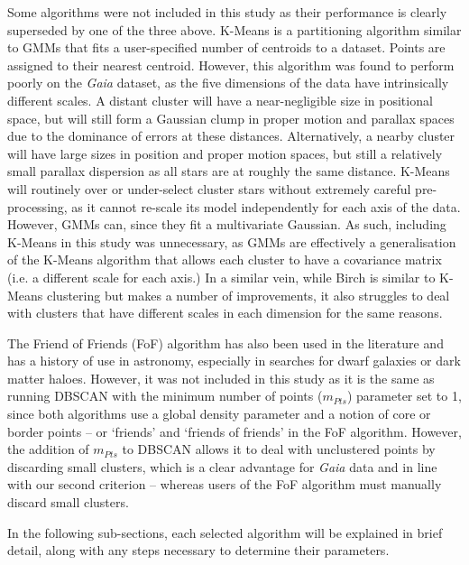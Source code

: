 Some algorithms were not included in this study as their performance is clearly superseded by one of the three above. K-Means \citep{macqueen_methods_1967} is a partitioning algorithm similar to GMMs that fits a user-specified number of centroids to a dataset. Points are assigned to their nearest centroid. However, this algorithm was found to perform poorly on the \emph{Gaia} dataset, as the five dimensions of the data have intrinsically different scales. A distant cluster will have a near-negligible size in positional space, but will still form a Gaussian clump in proper motion and parallax spaces due to the dominance of \emph{} errors at these distances. Alternatively, a nearby cluster will have large sizes in position and proper motion spaces, but still a relatively small parallax dispersion as all stars are at roughly the same distance. K-Means will routinely over or under-select cluster stars without extremely careful pre-processing, as it cannot re-scale its model independently for each axis of the data. However, GMMs can, since they fit a multivariate Gaussian. As such, including K-Means in this study was unnecessary, as GMMs are effectively a generalisation of the K-Means algorithm that allows each cluster to have a covariance matrix (i.e. a different scale for each axis.) In a similar vein, while Birch \citep{zhang_birch_1996} is similar to K-Means clustering but makes a number of improvements, it also struggles to deal with clusters that have different scales in each dimension for the same reasons.

The Friend of Friends (FoF) algorithm has also been used in the literature \citep{liu_catalog_2019} and has a history of use in astronomy, especially in searches for dwarf galaxies \citep[e.g.][]{duarte_how_2014} or dark matter haloes. However, it was not included in this study as it is the same as running DBSCAN with the minimum number of points ($m_{Pts}$) parameter set to 1, since both algorithms use a global density parameter and a notion of core or border points -- or `friends' and `friends of friends' in the FoF algorithm. However, the addition of $m_{Pts}$ to DBSCAN allows it to deal with unclustered points by discarding small clusters, which is a clear advantage for \emph{Gaia} data and in line with our second criterion -- whereas users of the FoF algorithm must manually discard small clusters.

In the following sub-sections, each selected algorithm will be explained in brief detail, along with any steps necessary to determine their parameters.


